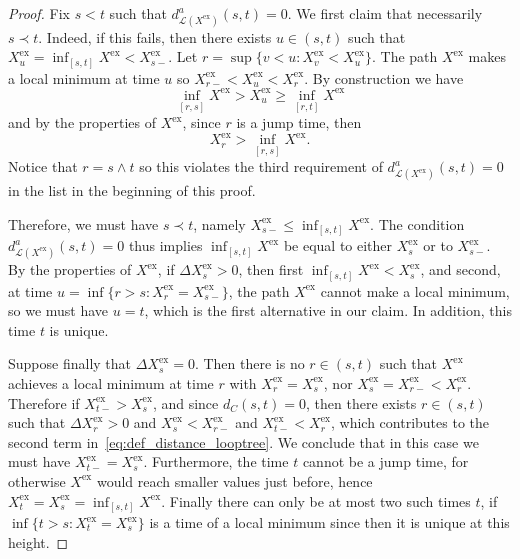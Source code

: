 \documentclass[british, a4paper,11pt]{article}
\numberwithin{equation}{section}
\theoremstyle{definition}
\newcommand{\Loop}{\mathscr{L}}
\newcommand{\exc}{\mathrm{ex}}
\begin{document}
\begin{proof}
Fix $s<t$ such that $d^a_{\Loop(X^{\exc})}(s,t) = 0$.
We first claim that necessarily $s \prec t$.
Indeed, if this fails, then there exists $u \in (s,t)$ such that $X^{\exc}_u = \inf_{[s,t]} X^{\exc} < X^{\exc}_{s-}$. Let $r = \sup\{v < u \colon X^{\exc}_v < X^{\exc}_{u}\}$.
The path $X^{\exc}$ makes a local minimum at time $u$ so $X^{\exc}_{r-} < X^{\exc}_u < X^{\exc}_r$. 
By construction we have
\[\inf_{[r,s]} X^{\exc} > X^{\exc}_u \ge \inf_{[r,t]} X^{\exc}\]
and by the properties of $X^{\exc}$, since $r$ is a jump time, then
\[X^{\exc}_r > \inf_{[r,s]} X^{\exc}.\]
Notice that $r = s \wedge t$ so this violates the third requirement of $d^a_{\Loop(X^{\exc})}(s,t) = 0$ in the list in the beginning of this proof.


Therefore, we must have $s \prec t$, namely $X^{\exc}_{s-} \leq \inf_{[s,t]} X^{\exc}$.
The condition $d^a_{\Loop(X^{\exc})}(s,t) = 0$ thus implies $\inf_{[s, t]} X^{\exc}$ be equal to either $X^{\exc}_s$ or to $X^{\exc}_{s-}$.
By the properties of $X^{\exc}$, if $\Delta X^{\exc}_s > 0$, then first $\inf_{[s, t]} X^{\exc} < X^{\exc}_s$, and second, at time $u = \inf\{r>s \colon X^{\exc}_r = X^{\exc}_{s-}\}$, the path $X^{\exc}$ cannot make a local minimum, so we must have $u=t$, which is the first alternative in our claim. In addition, this time $t$ is unique.

Suppose finally that $\Delta X^{\exc}_s = 0$.
Then there is no $r \in (s,t)$ such that $X^{\exc}$ achieves a local minimum at time $r$ with $X^{\exc}_r=X^{\exc}_s$, nor $X^{\exc}_s = X^{\exc}_{r-} < X^{\exc}_r$.
Therefore if $X^{\exc}_{t-} > X^{\exc}_s$, and since $d_C(s,t)=0$, then there exists $r \in (s,t)$ such that $\Delta X^{\exc}_r > 0$ and $X^{\exc}_s < X^{\exc}_{r-}$ and $X^{\exc}_{t-} < X^{\exc}_r$, which contributes to the second term in~\eqref{eq:def_distance_looptree}. We conclude that in this case we must have $X^{\exc}_{t-}=X^{\exc}_s$. Furthermore, the time $t$ cannot be a jump time, for otherwise $X^{\exc}$ would reach smaller values just before, hence $X^{\exc}_t=X^{\exc}_s = \inf_{[s,t]} X^{\exc}$. 
Finally there can only be at most two such times $t$, if $\inf\{t>s \colon X^{\exc}_t = X^{\exc}_s\}$ is a time of a local minimum since then it is unique at this height.
\end{proof}
\end{document}
